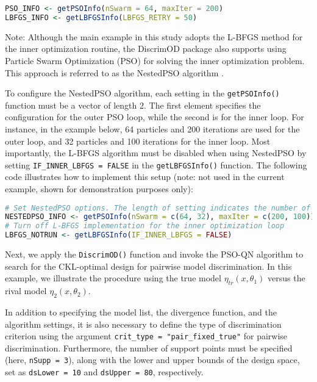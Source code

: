 \begin{lstlisting}[language=R, caption={Configuring Algorithm Parameters (PSO and L-BFGS)}]
PSO_INFO <- getPSOInfo(nSwarm = 64, maxIter = 200)
LBFGS_INFO <- getLBFGSInfo(LBFGS_RETRY = 50)
\end{lstlisting}

Note: Although the main example in this study adopts the L-BFGS method for the inner optimization routine, the DiscrimOD package also supports using Particle Swarm Optimization (PSO) for solving the inner optimization problem. This approach is referred to as the NestedPSO algorithm \citep{chen2015minimax}.

\hspace*{8mm} To configure the NestedPSO algorithm, each setting in the \verb|getPSOInfo()| function must be a vector of length 2. The first element specifies the configuration for the outer PSO loop, while the second is for the inner loop. For instance, in the example below, 64 particles and 200 iterations are used for the outer loop, and 32 particles and 100 iterations for the inner loop. Most importantly, the L-BFGS algorithm must be disabled when using NestedPSO by setting \verb|IF_INNER_LBFGS = FALSE| in the \verb|getLBFGSInfo()| function. The following code illustrates how to implement this setup (note: not used in the current example, shown for demonstration purposes only):

\begin{lstlisting}[language=R, caption={Alternative Setup Using NestedPSO}]
# Set NestedPSO options. The length of setting indicates the number of loops
NESTEDPSO_INFO <- getPSOInfo(nSwarm = c(64, 32), maxIter = c(200, 100))
# Turn off L-BFGS implementation for the inner optimization loop
LBFGS_NOTRUN <- getLBFGSInfo(IF_INNER_LBFGS = FALSE)
\end{lstlisting}

\hspace*{8mm} Next, we apply the \verb|DiscrimOD()| function and invoke the PSO-QN algorithm to search for the CKL-optimal design for pairwise model discrimination. In this example, we illustrate the procedure using the true model $\eta_{tr}(x, \theta_1)$ versus the rival model $\eta_2(x, \theta_2)$.

\hspace*{8mm} In addition to specifying the model list, the divergence function, and the algorithm settings, it is also necessary to define the type of discrimination criterion using the argument \verb|crit_type = "pair_fixed_true"| for pairwise discrimination. Furthermore, the number of support points must be specified (here, \verb|nSupp = 3|), along with the lower and upper bounds of the design space, set as \verb|dsLower = 10| and \verb|dsUpper = 80|, respectively.


